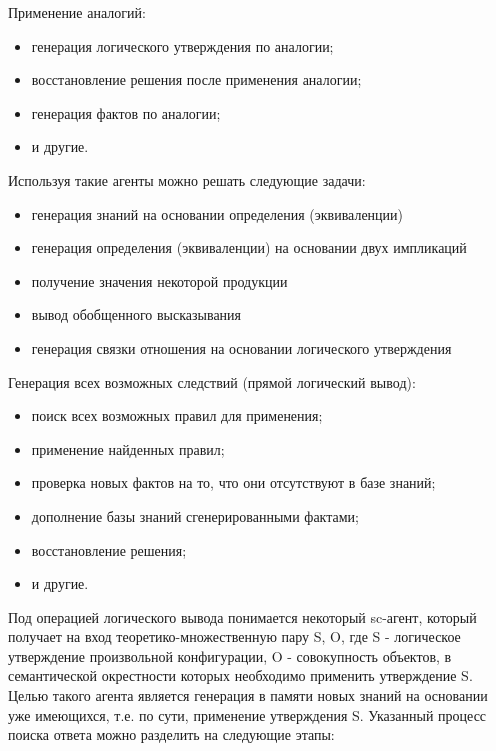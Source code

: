 Применение аналогий:
\begin{itemize}
	\item{генерация логического утверждения по аналогии;}
	\item{восстановление решения после применения аналогии;}
	\item{генерация фактов по аналогии;}
	\item{и другие.}
\end{itemize}

Используя такие агенты можно решать следующие задачи:
\begin{itemize}
	\item{генерация знаний на основании определения (эквиваленции)}
	\item{генерация определения (эквиваленции) на основании двух импликаций}
	\item{получение значения некоторой продукции}
	\item{вывод обобщенного высказывания}
	\item{генерация связки отношения на основании логического утверждения}
\end{itemize}

Генерация всех возможных следствий (прямой логический вывод):
\begin{itemize}
	\item{поиск всех возможных правил для применения;}
	\item{применение найденных правил;}
	\item{проверка новых фактов на то, что они отсутствуют в базе знаний;}
	\item{дополнение базы знаний сгенерированными фактами;}
	\item{восстановление решения;}
	\item{и другие.}
\end{itemize}

Под операцией логического вывода понимается некоторый sc-агент, который получает на вход теоретико-множественную пару {S, O}, где S - логическое утверждение произвольной конфигурации, O - совокупность объектов, в семантической окрестности которых необходимо применить утверждение S. Целью такого агента является генерация в памяти новых знаний на основании уже имеющихся, т.е. по сути, применение утверждения S. Указанный процесс поиска ответа можно разделить на следующие этапы:

